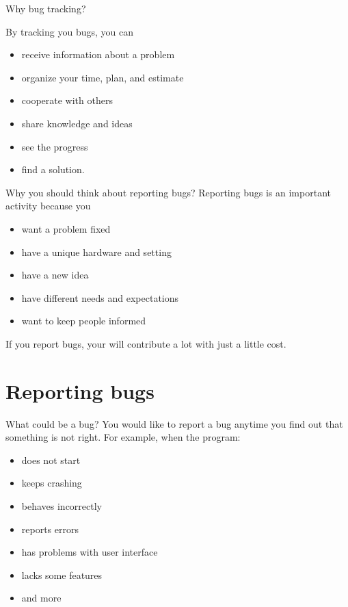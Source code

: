 \documentclass[12pt]{beamer}
\begin{document}
\begin{frame}{Why bug tracking?}

By tracking you bugs, you can

\begin{itemize}
	\item receive information about a problem
	\item organize your time, plan, and estimate
	\item cooperate with others
	\item share knowledge and ideas
	\item see the progress
	\item find a solution.
\end{itemize}
\end{frame}

\begin{frame}{Why you should think about reporting bugs?}
Reporting bugs is an important activity because you
\begin{itemize}
	\item want a problem fixed
	\item have a unique hardware and setting
	\item have a new idea
	\item have different needs and expectations
	\item want to keep people informed
\end{itemize}
If you report bugs, your will contribute a lot with just a little cost.
\end{frame}

\section{Reporting bugs}

\begin{frame}{What could be a bug?}
You would like to report a bug anytime you find out that something is not right. For example, when the program:
\begin{itemize}
	\item does not start
	\item keeps crashing
	\item behaves incorrectly
	\item reports errors
	\item has problems with user interface
	\item lacks some features
	\item and more
\end{itemize}
\end{frame}
\end{document}
